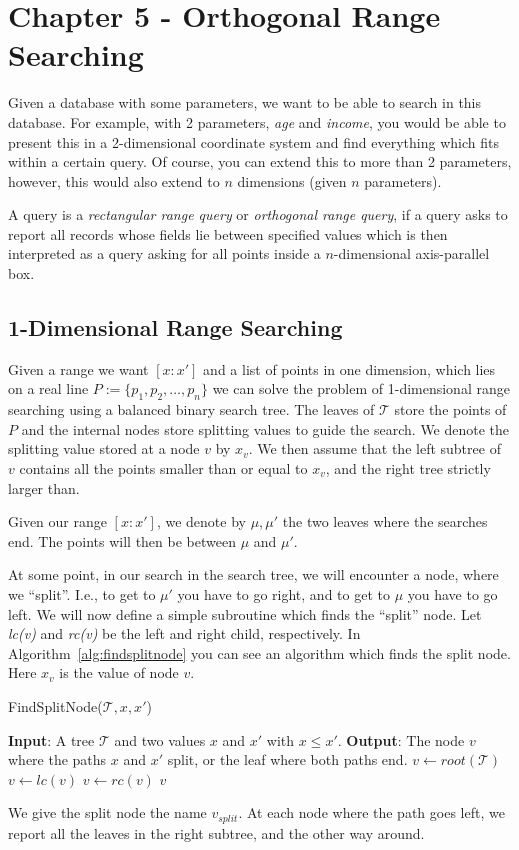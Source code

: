 \chapter{Chapter 5 - Orthogonal Range Searching}

Given a database with some parameters, we want to be able to search in this database. For example, with 2 parameters, \textit{age} and \textit{income}, you would be able to present this in a 2-dimensional coordinate system and find everything which fits within a certain query. Of course, you can extend this to more than 2 parameters, however, this would also extend to $n$ dimensions (given $n$ parameters).

A query is a \textit{rectangular range query} or \textit{orthogonal range query}, if a query asks to report all records whose fields lie between specified values which is then interpreted as a query asking for all points inside a $n$-dimensional axis-parallel box.

\section{1-Dimensional Range Searching}%
\label{sec:5.1}

Given a range we want $[x : x']$ and a list of points in one dimension, which lies on a real line $P := \{p_{1}, p_{2}, \ldots, p_{n}\}$ we can solve the problem of 1-dimensional range searching using a balanced binary search tree. The leaves of $\mathcal{T}$ store the points of $P$ and the internal nodes store splitting values to guide the search. We denote the splitting value stored at a node $v$ by $x_{v}$. We then assume that the left subtree of $v$ contains all the points smaller than or equal to $x_{v}$, and the right tree strictly larger than.

Given our range $[x : x']$, we denote by $\mu, \mu'$ the two leaves where the searches end. The points will then be between \(\mu\) and \(\mu'\).

At some point, in our search in the search tree, we will encounter a node, where we ``split''. I.e., to get to $\mu'$ you have to go right, and to get to $\mu$ you have to go left. We will now define a simple subroutine which finds the ``split'' node. Let \textit{lc(v)} and \textit{rc(v)} be the left and right child, respectively. In Algorithm~\ref{alg:findsplitnode} you can see an algorithm which finds the split node. Here $x_{v}$ is the value of node $v$.

\begin{algorithm}
	\caption{\label{alg:findsplitnode} FindSplitNode($\mathcal{T}, x, x'$)}
	\begin{algorithmic}[1]
		\STATE \textbf{Input}: A tree $\mathcal{T}$ and two values $x$ and $x'$ with $x \le x'$.
		\STATE \textbf{Output}: The node $v$ where the paths $x$ and $x'$ split, or the leaf where both paths end.
		\STATE $v \gets root(\mathcal{T})$
		\STATE $v \gets lc(v)$
		\ELSE
		\STATE $v \gets rc(v)$
		\ENDIF
		\ENDWHILE
		\RETURN $v$
	\end{algorithmic}
\end{algorithm}

We give the split node the name $v_{split}$. At each node where the path goes left, we report all the leaves in the right subtree, and the other way around.


